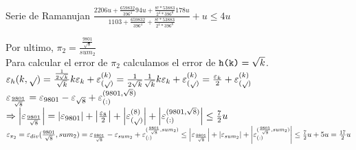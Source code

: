 \begin{subsection}{Serie de Ramanujan}
	$\frac{2206u + \frac{659832}{396^4}94u + \frac{8!*53883}{2^4*396^8}178u}{1103 + \frac{659832}{396^4} + \frac{8!*53883}{2^4*396^8}} + u \leq 4u$\\
	
	\pa
	
	Por ultimo, $\pi_2=\frac{\frac{9801}{\sqrt{8}}}{sum_2}$\\
	
	Para calcular el error de $\pi_2$ calculamos el error de $\texttt{h(k)}=\sqrt{k}$.\\
	
	$\varepsilon _{h}({k,\sqrt{ }}) = \frac{\frac{1}{2\sqrt{k}}}{\sqrt{k}}k\varepsilon _{k} + \varepsilon _{({\sqrt{ }})}^{({k})} = \frac{1}{2\sqrt{k}}\frac{1}{\sqrt{k}}k\varepsilon _{k} + \varepsilon _{({\sqrt{ }})}^{({k})} = \frac{\varepsilon _{k}}{2} + \varepsilon _{({\sqrt{ }})}^{({k})}$\\
	
	$\varepsilon _{\frac{9801}{\sqrt{8}}} = \varepsilon _{9801} - \varepsilon _{\sqrt{8}} + \varepsilon _{({:})}^{({9801,\sqrt{8}})}$\\
	$\Rightarrow \left|\varepsilon _{\frac{9801}{\sqrt{8}}}\right| = \left|\varepsilon _{9801}\right| + \left|\frac{\varepsilon _{8}}{2}\right| + \left|\varepsilon _{({\sqrt{ }})}^{({8})}\right| + \left|\varepsilon _{({:})}^{({9801,\sqrt{8}})}\right| \leq \frac{7}{2}u$\\
		
	$\varepsilon _{\pi_2} = \varepsilon _{div}({\frac{9801}{\sqrt{8}},sum_2}) = \varepsilon _{\frac{9801}{\sqrt{8}}} - \varepsilon _{sum_2} + \varepsilon _{({:})}^{({\frac{9801}{\sqrt{8}},sum_2})} \leq \left|\varepsilon _{\frac{9801}{\sqrt{8}}}\right| + \left|\varepsilon _{sum_2}\right| + \left|\varepsilon _{({:})}^{({\frac{9801}{\sqrt{8}},sum_2})}\right| \leq \frac{7}{2}u + 5u = \frac{17}{2}u$\\
		
\end{subsection}